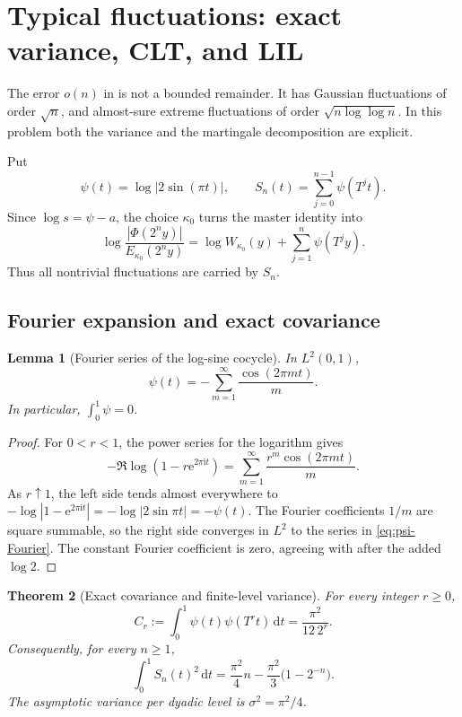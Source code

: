 \documentclass[11pt,oneside]{article}
\numberwithin{equation}{section}
\newtheorem{theorem}{Theorem}[section]
\newtheorem{lemma}[theorem]{Lemma}
\theoremstyle{definition}
\theoremstyle{remark}
\newcommand{\e}{\mathrm e}
\newcommand{\ii}{\mathrm i}
\newcommand{\dd}{\,\mathrm d}
\newcommand{\abs}[1]{\left|#1\right|}
\newcommand{\PhiUp}{\Phi}
\newcommand{\defeq}{\mathrel{:=}}
\begin{document}
\section{Typical fluctuations: exact variance, CLT, and LIL}
\label{sec:fluctuations}

The error \(o(n)\) in  is not a bounded remainder.  It has Gaussian
fluctuations of order \(\sqrt n\), and almost-sure extreme fluctuations of order
\(\sqrt{n\log\log n}\).  In this problem both the variance and the martingale decomposition
are explicit.

Put
\begin{equation}
 \psi(t)=\log\abs{2\sin(\pi t)},
 \qquad
 S_n(t)=\sum_{j=0}^{n-1}\psi(T^jt).
 \label{eq:psi-S}
\end{equation}
Since \(\log s=\psi-a\), the choice \(\kappa_0\) turns the master identity into
\begin{equation}
 \log\frac{\abs{\PhiUp(2^ny)}}{E_{\kappa_0}(2^ny)}
 =\log W_{\kappa_0}(y)+\sum_{j=1}^{n}\psi(T^jy).
 \label{eq:centered-master}
\end{equation}
Thus all nontrivial fluctuations are carried by \(S_n\).

\subsection{Fourier expansion and exact covariance}

\begin{lemma}[Fourier series of the log-sine cocycle]
\label{lem:psi-Fourier}
In \(L^2(0,1)\),
\begin{equation}
 \psi(t)=-\sum_{m=1}^{\infty}\frac{\cos(2\pi mt)}{m}.
 \label{eq:psi-Fourier}
\end{equation}
In particular, \(\int_0^1\psi=0\).
\end{lemma}

\begin{proof}
For \(0<r<1\), the power series for the logarithm gives
\[
 -\Re\log(1-r\e^{2\pi\ii t})
 =\sum_{m=1}^{\infty}\frac{r^m\cos(2\pi mt)}{m}.
\]
As \(r\uparrow1\), the left side tends almost everywhere to
\(-\log|1-\e^{2\pi\ii t}|=-\log|2\sin\pi t|=-\psi(t)\).  The Fourier coefficients
\(1/m\) are square summable, so the right side converges in \(L^2\) to the series in
\eqref{eq:psi-Fourier}.  The constant Fourier coefficient is zero, agreeing with
 after the added \(\log2\).
\end{proof}

\begin{theorem}[Exact covariance and finite-level variance]
\label{thm:exact-variance}
For every integer \(r\ge0\),
\begin{equation}
 C_r\defeq\int_0^1\psi(t)\psi(T^rt)\dd t
 =\frac{\pi^2}{12\,2^r}.
 \label{eq:covariance}
\end{equation}
Consequently, for every \(n\ge1\),
\begin{equation}
 \boxed{
 \int_0^1S_n(t)^2\dd t
 =\frac{\pi^2}{4}n-\frac{\pi^2}{3}\bigl(1-2^{-n}\bigr).}
 \label{eq:exact-variance}
\end{equation}
The asymptotic variance per dyadic level is \(\sigma^2=\pi^2/4\).
\end{theorem}
\end{document}
